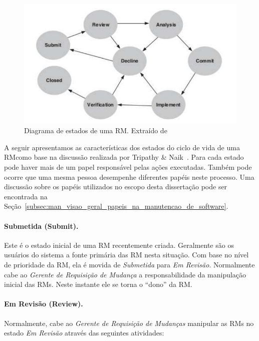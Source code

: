 \begin{figure}[htpb]
	\centering
	\includegraphics[width=0.8\linewidth]{./chapter-manutencao-software-visao-geral/img/diagrama-estado-rm.pdf}
	\caption{Diagrama de estados de uma RM\@. Extraído
		de~\cite{tripathy2014software}}
\label{fig:diagrama-estado-rm}
\end{figure}

A seguir apresentamos as características dos estados do ciclo de vida de uma
RM\@ como base na discussão realizada por Tripathy \&
Naik~\cite{tripathy2014software}. Para cada estado pode haver mais de um papel
responsável pelas ações executadas. Também pode ocorre que uma mesma pessoa
desempenhe diferentes papéis neste processo. Uma discussão sobre os papéis
utilizados no escopo desta dissertação pode ser encontrada na
Seção~\ref{subsec:man_visao_geral_papeis_na_manutencao_de_software}.

\paragraph{Submetida (Submit).}
\label{par:submetida)}

Este é o estado inicial de uma RM recentemente criada. Geralmente são os
usuários do sistema a fonte primária das RM nesta situação. Com base no nível de
prioridade da RM, ela é movida de \textit{Submetida} para \textit{Em Revisão}.
Normalmente cabe ao \textit{Gerente de Requisição de Mudança} a responsabilidade
da manipulação inicial das RMs. Neste instante ele se torna o ``dono'' da RM\@.

\paragraph{Em Revisão (Review).}
\label{par:em_revisao}
Normalmente, cabe ao \textit{Gerente de Requisição de Mudanças} manipular as
RMs no estado \textit{Em Revisão} através das seguintes atividades:

